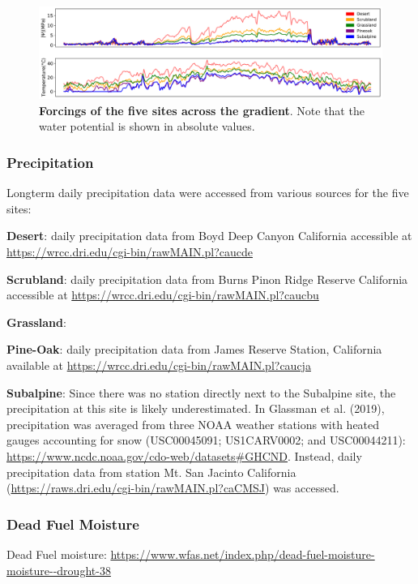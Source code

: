 \documentclass[letterpaper, 10pt]{article}
\begin{document}
\begin{figure}[h]
\centering
      \includegraphics[width=1.0\linewidth]{../figures/gradient_forcing.pdf}
      \caption{\textbf{Forcings of the five sites across the gradient}. Note that the water potential is shown in absolute values.}
      \label{fig: figure 2}
\end{figure}

\subsubsection{Precipitation}
Longterm daily precipitation data were accessed from various sources for the five sites:

\textbf{Desert}: daily precipitation data from Boyd Deep Canyon California accessible at \url{https://wrcc.dri.edu/cgi-bin/rawMAIN.pl?caucde}

\textbf{Scrubland}: daily precipitation data from Burns Pinon Ridge Reserve California accessible at \url{https://wrcc.dri.edu/cgi-bin/rawMAIN.pl?caucbu}

\textbf{Grassland}:

\textbf{Pine-Oak}: daily precipitation data from James Reserve Station, California available at \url{https://wrcc.dri.edu/cgi-bin/rawMAIN.pl?caucja}

\textbf{Subalpine}: Since there was no station directly next to the Subalpine site, the precipitation at this site is likely underestimated. In Glassman et al. (2019), precipitation was averaged from three NOAA weather stations with heated gauges accounting for snow (USC00045091; US1CARV0002; and USC00044211): \url{https://www.ncdc.noaa.gov/cdo-web/datasets#GHCND}. Instead, daily precipitation data from station Mt. San Jacinto California (\url{https://raws.dri.edu/cgi-bin/rawMAIN.pl?caCMSJ}) was accessed.

\subsubsection{Dead Fuel Moisture}

Dead Fuel moisture: \url{https://www.wfas.net/index.php/dead-fuel-moisture-moisture--drought-38}
\end{document}
